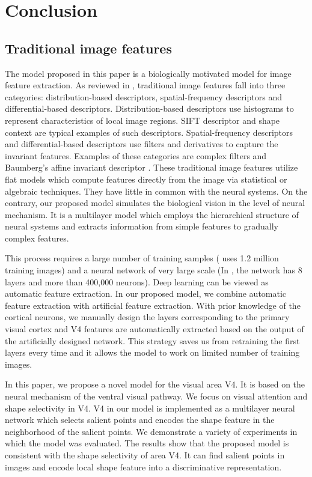 \documentclass[10pt]{article}
\begin{document}
\section{Conclusion}\label{sec:6}

\subsection{Traditional image features}

The model proposed in this paper is a biologically motivated model for image feature extraction.
As reviewed in \cite{mikolajczyk2005}, traditional image features fall into three categories: 
distribution-based descriptors, spatial-frequency descriptors and differential-based descriptors.
Distribution-based descriptors use histograms to represent characteristics of local image regions.
SIFT descriptor \cite{lowe1999} and shape context \cite{belongie2002} are typical examples of such descriptors.
Spatial-frequency descriptors and differential-based descriptors use filters and derivatives to capture the invariant features. 
Examples of these categories are complex filters \cite{schaffalitzky2002} and Baumberg's affine invariant descriptor \cite{baumberg2000}.
These traditional image features utilize flat models which compute features directly from the image via statistical or algebraic techniques. 
They have little in common with the neural systems.
On the contrary, our proposed model simulates the biological vision in the level of neural mechanism.
It is a multilayer model which employs the hierarchical structure of neural systems and extracts information from simple features to gradually complex features. 

This process requires a large number of training samples (\cite{krizhevsky2012} uses 1.2 million training images)
and a neural network of very large scale (In \cite{krizhevsky2012}, the network has 8 layers and more than 400,000 neurons).
Deep learning can be viewed as automatic feature extraction.
In our proposed model, we combine automatic feature extraction with artificial feature extraction.
With prior knowledge of the cortical neurons, we manually design the layers corresponding to the primary visual cortex
and V4 features are automatically extracted based on the output of the artificially designed network.
This strategy saves us from retraining the first layers every time
and it allows the model to work on limited number of training images.

In this paper, we propose a novel model for the visual area V4.
It is based on the neural mechanism of the ventral visual pathway.
We focus on visual attention and shape selectivity in V4.
V4 in our model is implemented as a multilayer neural network 
which selects salient points and encodes the shape feature in the neighborhood of the salient points.
We demonstrate a variety of experiments in which the model was evaluated.
The results show that the proposed model is consistent with the shape selectivity of area V4.
It can find salient points in images and encode local shape feature into a discriminative representation.
\end{document}
